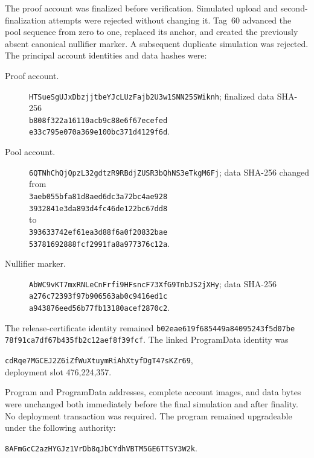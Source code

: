The proof account was finalized before verification.  Simulated upload and
second-finalization attempts were rejected without changing it.  Tag~60
advanced the pool sequence from zero to one, replaced its anchor, and created
the previously absent canonical nullifier marker.  A subsequent duplicate
simulation was rejected.  The principal account identities and data hashes
were:
\begin{description}
  \item[Proof account.]
  \texttt{HTSueSgUJxDbzjjtbeYJcLUzFajb2U3w1SNN25SWiknh}; finalized data
  SHA-256\\
  \texttt{b808f322a16110acb9c88e6f67ecefed}\\
  \texttt{e33c795e070a369e100bc371d4129f6d}.
  \item[Pool account.]
  \texttt{6QTNhChQjQpzL32gdtzR9RBdjZUSR3bQhNS3eTkgM6Fj}; data SHA-256 changed
  from\\
  \texttt{3aeb055bfa81d8aed6dc3a72bc4ae928}\\
  \texttt{3932841e3da893d4fc46de122bc67dd8}\\
  to\\
  \texttt{393633742ef61ea3d88f6a0f20832bae}\\
  \texttt{53781692888fcf2991fa8a977376c12a}.
  \item[Nullifier marker.]
  \texttt{AbWC9vKT7mxRNLeCnFrfi9HFsncF73XfG9TnbJS2jXHy}; data SHA-256\\
  \texttt{a276c72393f97b906563ab0c9416ed1c}\\
  \texttt{a943876eed56b77fb13180acef2870c2}.
\end{description}

The release-certificate identity remained
\texttt{b02eae619f685449a84095243f5d07be}\\
\texttt{78f91ca7df67b435fb2c12aef8f39fcf}.  The linked ProgramData identity was
\begin{center}
  \texttt{cdRqe7MGCEJ2Z6iZfWuXtuymRiAhXtyfDgT47sKZr69},\\
  deployment slot 476,224,357.
\end{center}
Program and ProgramData addresses,
complete account images, and data bytes were unchanged both immediately before
the final simulation and after finality.  No deployment transaction was
required.  The program remained upgradeable under the following authority:
\begin{center}
  \texttt{8AFmGcC2azHYGJz1VrDb8qJbCYdhVBTM5GE6TTSY3W2k}.
\end{center}

